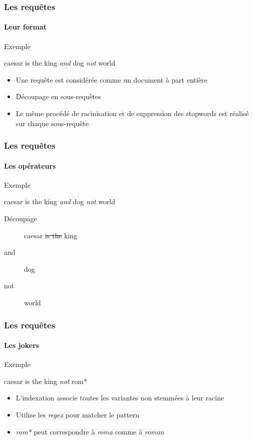 \documentclass{beamer}
\begin{document}
\begin{frame}

\frametitle{Les requ\^etes}
\framesubtitle{Leur format}

\begin{exampleblock}{Exemple}

caesar is the king \textit{and} dog \textit{not} world

\end{exampleblock}

\begin{itemize}
 \item Une requ\^ete est consid\'er\'ee comme un document \`a part enti\`ere
 \item D\'ecoupage en sous-requ\^etes
 \item Le m\^eme proc\'ed\'e de racinisation et de suppression des stopwords est r\'ealis\'e sur chaque sous-requ\^ete
\end{itemize}


 
\end{frame}

\begin{frame}

\frametitle{Les requ\^etes}
\framesubtitle{Les op\'erateurs}

\begin{exampleblock}{Exemple}

caesar is the king \textit{and} dog \textit{not} world

\end{exampleblock}

\begin{exampleblock}{D\'ecoupage}

\begin{description}
\item[] caesar \sout{is the} king 
\item[and] dog 
\item[not] world
\end{description}


\end{exampleblock}

 
\end{frame}

\begin{frame}

\frametitle{Les requ\^etes}
\framesubtitle{Les jokers}

\begin{exampleblock}{Exemple}

caesar is the king \textit{not} rom*

\end{exampleblock}

\begin{itemize}
 \item L'indexation associe toutes les variantes non stemm\'ees \`a leur racine
 \item Utilise les \textit{regex} pour matcher le pattern
 \item \textit{rom*} peut correspondre \`a \textit{roma} comme \`a \textit{roman}
\end{itemize}

 
\end{frame}
\end{document}
